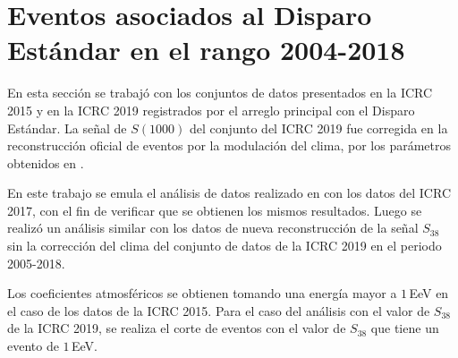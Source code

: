 
\section{Eventos asociados al Disparo Estándar en el rango 2004-2018}\label{Stan_modulacion}	
	
En esta sección se trabajó con los conjuntos de datos  presentados en la ICRC 2015  y  en la ICRC 2019 registrados por el arreglo principal con el Disparo Estándar. La señal de $S(1000)$ del conjunto del ICRC 2019 fue corregida en la reconstrucción oficial de eventos por la modulación del clima, por los parámetros obtenidos en \cite{aab2017impact}. 

En este trabajo se emula el análisis de datos realizado en \cite{aab2017impact} con los datos del ICRC 2017, con el fin de verificar que se obtienen los mismos resultados. Luego se realizó un análisis similar con los datos de nueva reconstrucción de la señal $S_{38}$ sin la corrección del clima  del conjunto de datos de la ICRC 2019 en el periodo 2005-2018. 

Los coeficientes atmosféricos se obtienen tomando una energía mayor a $1\,$EeV en el caso de los datos de la ICRC 2015. Para el caso del análisis con el valor de $S_{38}$ de la ICRC 2019, se realiza el corte de eventos con el valor de $S_{38}$  que tiene un evento de $1\,$EeV.  


